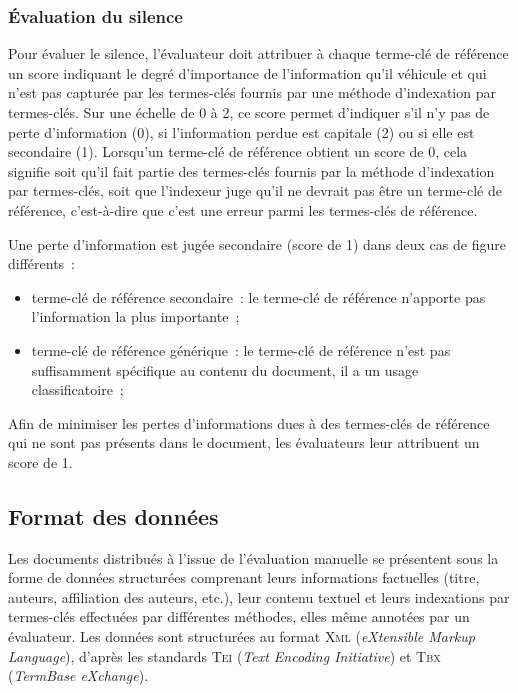       \subsubsection{Évaluation du silence}
      \label{subsubsec:main-automatic_evaluation_of_keyphrase_annotation-methodology-evaluation_protocol-silence}
        Pour évaluer le silence, l'évaluateur doit attribuer à chaque terme-clé
        de référence un score indiquant le degré d'importance de l'information
        qu'il véhicule et qui n'est pas capturée par les termes-clés fournis par
        une méthode d'indexation par termes-clés. Sur une échelle de 0 à 2, ce
        score permet d'indiquer s'il n'y pas de perte d'information (0), si
        l'information perdue est capitale (2) ou si elle est secondaire (1).
        Lorsqu'un terme-clé de référence obtient un score de 0, cela signifie
        soit qu'il fait partie des termes-clés fournis par la méthode
        d'indexation par termes-clés, soit que l'indexeur juge qu'il ne devrait
        pas être un terme-clé de référence, c'est-à-dire que c'est une erreur
        parmi les termes-clés de référence.

        Une perte d'information est jugée secondaire (score de 1) dans deux
        cas de figure différents~:
        \begin{itemize}
          \item{terme-clé de référence secondaire~: le terme-clé de référence
                n'apporte pas l'information la plus importante~;}
          \item{terme-clé de référence générique~: le terme-clé de référence
                n'est pas suffisamment spécifique au contenu du document, il a
                un usage classificatoire~;}
        \end{itemize}
        Afin de minimiser les pertes d'informations dues à des termes-clés de
        référence qui ne sont pas présents dans le document, les évaluateurs
        leur attribuent un score de 1.

    \subsection{Format des données}
    \label{subsec:main-automatic_evaluation_of_keyphrase_annotation-methodology-data_format}
      Les documents distribués à l'issue de l'évaluation manuelle se présentent
      sous la forme de données structurées comprenant leurs informations
      factuelles (titre, auteurs, affiliation des auteurs, etc.), leur contenu
      textuel et leurs indexations par termes-clés effectuées par différentes
      méthodes, elles même annotées par un évaluateur. Les données sont
      structurées au format \textsc{Xml} (\textit{eXtensible Markup Language}),
      d'après les standards \textsc{Tei} (\textit{Text Encoding Initiative}) et
      \textsc{Tbx} (\textit{TermBase eXchange}).

